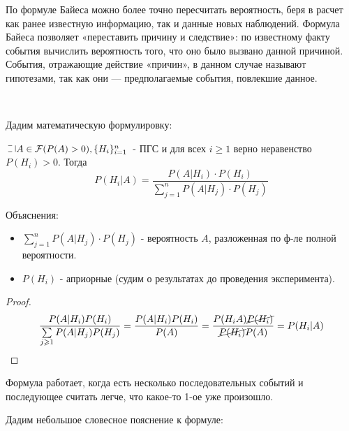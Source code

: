 \begin{definition}
	По формуле Байеса можно более точно пересчитать вероятность, беря в расчет как ранее известную информацию, так и данные новых наблюдений. Формула Байеса позволяет «переставить причину и следствие»: по известному факту события вычислить вероятность того, что оно было вызвано данной причиной. События, отражающие действие «причин», в данном случае называют гипотезами, так как они — предполагаемые события, повлекшие данное.
	
	~
	
	Дадим математическую формулировку:
	
	\noindent $\letus A \in \mathcal{F} (P(A) > 0), \{ H_i \}_{i=1}^n$ - ПГС и для всех $i \ge 1$ верно неравенство $P(H_i) > 0$. Тогда
	\[ P(H_i|A) = \frac{P(A|H_i) \cdot P(H_i)}{\sum\limits_{j=1}^{n} P(A|H_j) \cdot P(H_j)} \]
\end{definition}

Объяснения:
\begin{itemize}
	\item $\sum\limits_{j=1}^{n} P(A|H_j) \cdot P(H_j)$ - вероятность $A$, разложенная по ф-ле полной вероятности.
	\item $P(H_i)$ - априорные (судим о результатах до проведения эксперимента).
\end{itemize}

\begin{proof}
	\[ \frac{P(A|H_i)P(H_i)}{\sum\limits_{j \ge 1} P(A|H_j)P(H_j)} = \frac{P(A|H_i) P(H_i)}{P(A)} = \frac{P(H_iA)\cancel{P(H_i)}}{\cancel{P(H_i)}P(A)} = P(H_i|A) \]
\end{proof}

\begin{remark}
	Формула работает, когда есть несколько последовательных событий и последующее считать легче, что какое-то 1-ое уже произошло.
\end{remark}

Дадим небольшое словесное пояснение к формуле:
\begin{figure}[H]
\end{figure}

